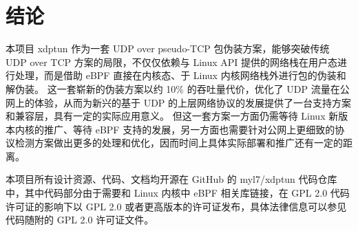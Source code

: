 

\chapter{结论}

本项目 xdptun 作为一套 UDP over pseudo-TCP 包伪装方案，能够突破传统 UDP over TCP 方案的局限，不仅仅依赖与 Linux API 提供的网络栈在用户态进行处理，而是借助 eBPF
直接在内核态、于 Linux 内核网络栈外进行包的伪装和解伪装。
这一套崭新的伪装方案以约 10\% 的吞吐量代价，优化了 UDP 流量在公网上的体验，从而为新兴的基于 UDP 的上层网络协议的发展提供了一台支持方案和兼容层，具有一定的实际应用意义。
但这一套方案一方面仍需等待 Linux 新版本内核的推广、等待 eBPF 支持的发展，另一方面也需要针对公网上更细致的协议检测方案做出更多的处理和优化，因而时间上具体实际部署和推广还有一定的距离。

本项目所有设计资源、代码、文档均开源在 GitHub 的 myl7/xdptun 代码仓库中，其中代码部分由于需要和 Linux 内核中 eBPF 相关库链接，在 GPL 2.0 代码许可证的影响下以 GPL 2.0 或者更高版本的许可证发布，具体法律信息可以参见代码随附的 GPL 2.0 许可证文件。
